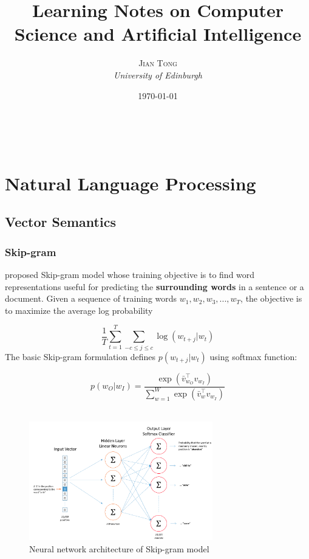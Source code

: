 \documentclass[a3paper, 12pt]{book} %
\title{\textbf{Learning Notes on Computer Science and Artificial Intelligence}\\ %
} %
\author{\textsc{Jian Tong} %
\\{\textit{University of Edinburgh}}} %
\date{\today} %
\makeatletter
\renewcommand{\maketitle}{ %
\begin{flushright} %
{\LARGE\@title} %

\vspace{50pt} %

{\large\@author} %
\\\@date %

\vspace{40pt} %
\end{flushright}
}
\makeatother
\begin{document}
\maketitle %

\vspace{30pt} %

\part{Natural Language Processing}


\chapter{Vector Semantics}
\section{Skip-gram}
\citep{mikolov2013distributed} proposed Skip-gram model whose training objective is to find word representations useful for predicting the \textbf{surrounding words} in a sentence or a document. Given a sequence of training words $w_1,w_2,w_3,...,w_T$, the objective is to maximize the average log probability

$$\frac{1}{T}\sum_{t=1}^{T}{\sum_{-c\le{j\le{c}}}{\log(w_{t+j}|w_t)}}$$
The basic Skip-gram formulation defines $p(w_{t+j}|w_t)$ using softmax function:

$$p(w_O|w_I)=\frac{\exp{(\bar{v}_{w_{O}}^{\top}v_{w_{I}})}}{\sum_{w=1}^{W}{\exp{(\bar{v}_{w}^{\top}v_{w_{I}})}}}$$ \\

\begin{figure}[htpb]
	\centering
	\includegraphics[width=8cm]{figures/skip_gram_architecture.png}
	\caption{Neural network architecture of Skip-gram model}
	\label{fig:skip_gram}
\end{figure}
\end{document}
